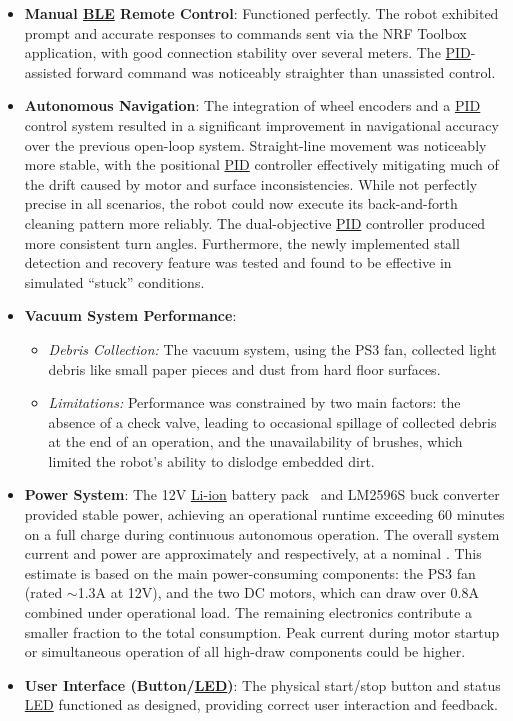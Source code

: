 \begin{itemize}
    \item \textbf{Manual \hyperref[term:ble]{BLE} Remote Control}: Functioned perfectly. The robot exhibited prompt and accurate responses to commands sent via the NRF Toolbox application, with good connection stability over several meters. The \hyperref[term:pid]{PID}-assisted forward command was noticeably straighter than unassisted control.
    \item \textbf{Autonomous Navigation}: The integration of wheel encoders and a \hyperref[term:pid]{PID} control system resulted in a significant improvement in navigational accuracy over the previous open-loop system. Straight-line movement was noticeably more stable, with the positional \hyperref[term:pid]{PID} controller effectively mitigating much of the drift caused by motor and surface inconsistencies. While not perfectly precise in all scenarios, the robot could now execute its back-and-forth cleaning pattern more reliably. The dual-objective \hyperref[term:pid]{PID} controller produced more consistent turn angles. Furthermore, the newly implemented stall detection and recovery feature was tested and found to be effective in simulated ``stuck'' conditions.
    \item \textbf{Vacuum System Performance}:
        \begin{itemize}
            \item \textit{Debris Collection:} The vacuum system, using the PS3 fan, collected light debris like small paper pieces and dust from hard floor surfaces.
            \item \textit{Limitations:} Performance was constrained by two main factors: the absence of a check valve, leading to occasional spillage of collected debris at the end of an operation, and the unavailability of brushes, which limited the robot's ability to dislodge embedded dirt.
        \end{itemize}
    \item \textbf{Power System}: The 12V \hyperref[term:liion]{Li-ion} battery pack~\cite{BatteryPack12V4000mAhDatasheet} and LM2596S buck converter provided stable power, achieving an operational runtime exceeding 60 minutes on a full charge during continuous autonomous operation. The overall system current and power are approximately \totalCurrent{} and \totalPower{} respectively, at a nominal \totalVoltage{}. This estimate is based on the main power-consuming components: the PS3 fan (rated $\sim$1.3A at 12V), and the two DC motors, which can draw over 0.8A combined under operational load. The remaining electronics contribute a smaller fraction to the total consumption. Peak current during motor startup or simultaneous operation of all high-draw components could be higher.
    \item \textbf{User Interface (Button/\hyperref[term:led]{LED})}: The physical start/stop button and status \hyperref[term:led]{LED} functioned as designed, providing correct user interaction and feedback.
\end{itemize}


